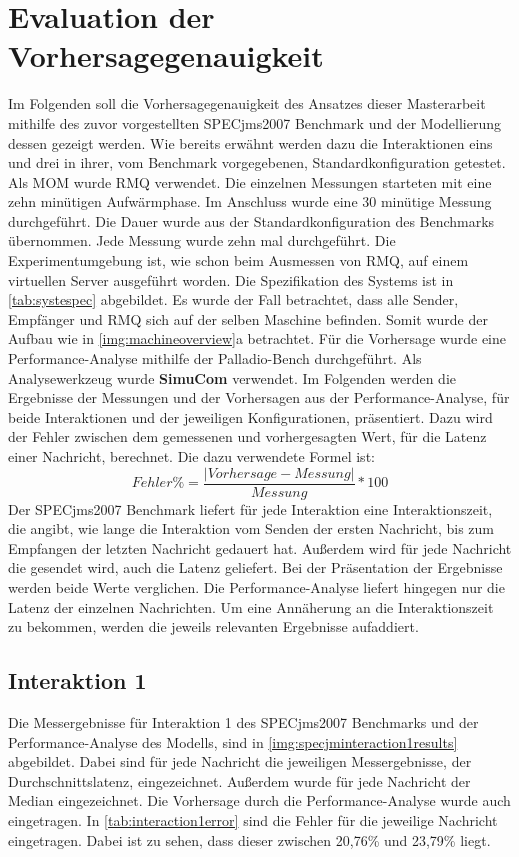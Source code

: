\section{Evaluation der Vorhersagegenauigkeit}
\label{sec:specjmsmodellvorhersage}
Im Folgenden soll die Vorhersagegenauigkeit des Ansatzes dieser Masterarbeit mithilfe des zuvor vorgestellten SPECjms2007 Benchmark und der Modellierung dessen gezeigt werden. Wie bereits erwähnt werden dazu die Interaktionen eins und drei in ihrer, vom Benchmark vorgegebenen, Standardkonfiguration getestet. Als MOM wurde RMQ verwendet. Die einzelnen Messungen starteten mit eine zehn minütigen Aufwärmphase. Im Anschluss wurde eine 30 minütige Messung durchgeführt. Die Dauer wurde aus der Standardkonfiguration des Benchmarks übernommen. Jede Messung wurde zehn mal durchgeführt. Die Experimentumgebung ist, wie schon beim Ausmessen von RMQ, auf einem virtuellen Server ausgeführt worden. Die Spezifikation des Systems ist in \autoref{tab:systespec} abgebildet. Es wurde der Fall betrachtet, dass alle Sender, Empfänger und RMQ sich auf der selben Maschine befinden. Somit wurde der Aufbau wie in \autoref{img:machineoverview}a betrachtet. Für die Vorhersage wurde eine Performance-Analyse mithilfe der Palladio-Bench durchgeführt. Als Analysewerkzeug wurde \textbf{SimuCom} verwendet. Im Folgenden werden die Ergebnisse der Messungen und der Vorhersagen aus der Performance-Analyse, für beide Interaktionen und der jeweiligen Konfigurationen, präsentiert. Dazu wird der Fehler zwischen dem gemessenen und vorhergesagten Wert, für die Latenz einer Nachricht, berechnet. Die dazu verwendete Formel ist:
\[ Fehler\% = \frac{|Vorhersage - Messung|}{Messung} * 100 \]
Der SPECjms2007 Benchmark liefert für jede Interaktion eine Interaktionszeit, die angibt, wie lange die Interaktion vom Senden der ersten Nachricht, bis zum Empfangen der letzten Nachricht gedauert hat. Außerdem wird für jede Nachricht die gesendet wird, auch die Latenz geliefert. Bei der Präsentation der Ergebnisse werden beide Werte verglichen. Die Performance-Analyse liefert hingegen nur die Latenz der einzelnen Nachrichten. Um eine Annäherung an die Interaktionszeit zu bekommen, werden die jeweils relevanten Ergebnisse aufaddiert.
\subsection{Interaktion 1}
Die Messergebnisse für Interaktion 1 des SPECjms2007 Benchmarks und der Performance-Analyse des Modells, sind in \autoref{img:specjminteraction1results} abgebildet. Dabei sind für jede Nachricht die jeweiligen Messergebnisse, der Durchschnittslatenz, eingezeichnet. Außerdem wurde für jede Nachricht der Median eingezeichnet. Die Vorhersage durch die Performance-Analyse wurde auch eingetragen. In \autoref{tab:interaction1error} sind die Fehler für die jeweilige Nachricht eingetragen. Dabei ist zu sehen, dass dieser zwischen 20,76\% und 23,79\% liegt. 

